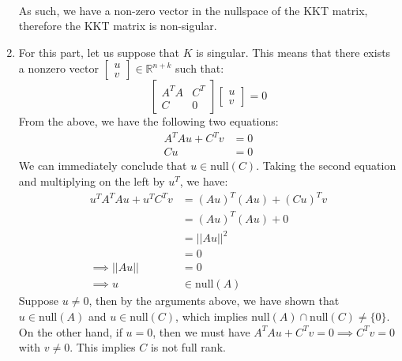 \documentclass[12pt]{exam}
\begin{document}
\begin{questions}
\begin{solution}
\begin{enumerate}[label=(\alph*)]
\begin{align*}
        \end{align*}
        As such, we have a non-zero vector in the nullspace of the KKT matrix, therefore the KKT matrix is non-sigular.
      \item
        For this part, let us suppose that $K$ is singular. This means that there exists a nonzero vector $\begin{bmatrix} u \\ v \end{bmatrix} \in \mathbb{R}^{n + k}$ such that:
        \[
          \begin{bmatrix}
            A^TA & C^T \\
            C & 0
          \end{bmatrix}
          \begin{bmatrix}
            u \\ v
          \end{bmatrix} = 0
        \]
        From the above, we have the following two equations:
        \begin{align*}
          A^TAu + C^Tv &= 0 \\
          Cu &= 0
        \end{align*}
        We can immediately conclude that $u \in \text{null}(C)$. Taking the second equation and multiplying on the left by $u^T$, we have:
        \begin{align*}
          u^TA^TAu + u^TC^Tv &= (Au)^T(Au) + (Cu)^Tv \\
          &= (Au)^T(Au) + 0 \tag{$Cu = 0$} \\
          &= ||Au||^2 \\
          &= 0\\
          \implies ||Au|| &= 0 \\
          \implies u &\in \text{null}(A)
        \end{align*}
        Suppose $u \neq 0$, then by the arguments above, we have shown that $u \in \text{null}(A)$ and $u \in \text{null}(C)$, which implies $\text{null}(A) \cap \text{null}(C) \neq \{0\}$. On the other hand, if $u = 0$, then we must have $A^TAu + C^Tv = 0 \implies C^Tv = 0$ with $v \neq 0$. This implies $C$ is not full rank.
    \end{enumerate}
  \end{solution}


\end{questions}
\end{document}
